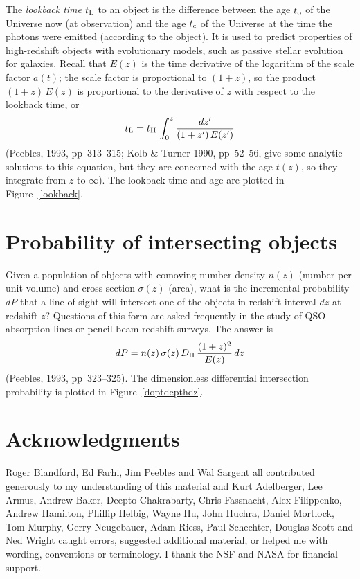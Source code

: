 The {\em lookback time\/} $t_{\rm L}$ to an object is the difference
between the age $t_{\rm o}$ of the Universe now (at observation) and
the age $t_{\rm e}$ of the Universe at the time the photons were
emitted (according to the object).  It is used to predict properties
of high-redshift objects with evolutionary models, such as passive
stellar evolution for galaxies.  Recall that $E(z)$ is the time
derivative of the logarithm of the scale factor $a(t)$; the scale
factor is proportional to $(1+z)$, so the product $(1+z)\,E(z)$ is
proportional to the derivative of $z$ with respect to the lookback
time, or
\begin{equation}
t_{\rm L} = t_{\rm H}\,\int_0^z \frac{dz'}{(1+z')\,E(z')}
\end{equation}
(Peebles, 1993, pp~313--315; Kolb \& Turner 1990, pp~52--56, give some
analytic solutions to this equation, but they are concerned with the
age $t(z)$, so they integrate from $z$ to $\infty$).  The lookback
time and age are plotted in Figure~\ref{lookback}.


\section{Probability of intersecting objects}
\label{sec:optdepth}

Given a population of objects with comoving number density $n(z)$
(number per unit volume) and cross section $\sigma(z)$ (area), what is
the incremental probability $dP$ that a line of sight will intersect
one of the objects in redshift interval $dz$ at redshift $z$?
Questions of this form are asked frequently in the study of QSO
absorption lines or pencil-beam redshift surveys.  The answer is
\begin{equation}
dP=n(z)\,\sigma(z)\,D_{\rm H}\,\frac{(1+z)^2}{E(z)}\,dz
\end{equation}
(Peebles, 1993, pp~323--325).  The dimensionless differential
intersection probability is plotted in Figure~\ref{doptdepthdz}.


\section*{Acknowledgments}

Roger Blandford, Ed Farhi, Jim Peebles and Wal Sargent all contributed
generously to my understanding of this material and Kurt Adelberger,
Lee Armus, Andrew Baker, Deepto Chakrabarty, Chris Fassnacht, Alex
Filippenko, Andrew Hamilton, Phillip Helbig, Wayne Hu, John Huchra,
Daniel Mortlock, Tom Murphy, Gerry Neugebauer, Adam Riess, Paul
Schechter, Douglas Scott and Ned Wright caught errors, suggested
additional material, or helped me with wording, conventions or
terminology.  I thank the NSF and NASA for financial support.

